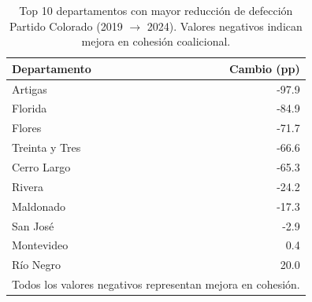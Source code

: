 \begin{table}[H]
\centering
\caption{Top 10 departamentos con mayor reducción de defección Partido Colorado (2019 $\to$ 2024). Valores negativos indican mejora en cohesión coalicional.}
\label{tab:dept_changes_pc_top10}
\begin{tabular}{lr}
\toprule
\textbf{Departamento} & \textbf{Cambio (pp)} \\
\midrule
Artigas & -97.9 \\
Florida & -84.9 \\
Flores & -71.7 \\
Treinta y Tres & -66.6 \\
Cerro Largo & -65.3 \\
Rivera & -24.2 \\
Maldonado & -17.3 \\
San José & -2.9 \\
Montevideo & 0.4 \\
Río Negro & 20.0 \\
\bottomrule
\multicolumn{2}{l}{\footnotesize Todos los valores negativos representan mejora en cohesión.} \\
\end{tabular}
\end{table}
